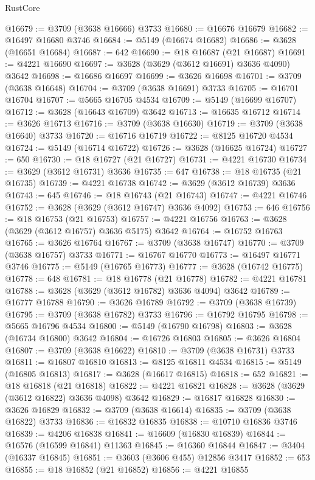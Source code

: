 \begin{lexlean}{RustCore}
\begin{coremodule}
@16679 := @3709 (@3638 @16666) @3733
@16680 := @16676 @16679
@16682 := @16497 @16680 @3746
@16684 := @5149 (@16674 @16682)
@16686 := @3628 (@16651 @16684)
@16687 := 642
@16690 := @18 @16687 (@21 @16687)
@16691 := @4221 @16690
@16697 := @3628 (@3629 (@3612 @16691) @3636 @4090) @3642
@16698 := @16686 @16697
@16699 := @3626 @16698
@16701 := @3709 (@3638 @16648)
@16704 := @3709 (@3638 @16691) @3733
@16705 := @16701 @16704
@16707 := @5665 @16705 @4534
@16709 := @5149 (@16699 @16707)
@16712 := @3628 (@16643 @16709) @3642
@16713 := @16635 @16712
@16714 := @3626 @16713
@16716 := @3709 (@3638 @16630)
@16719 := @3709 (@3638 @16640) @3733
@16720 := @16716 @16719
@16722 := @8125 @16720 @4534
@16724 := @5149 (@16714 @16722)
@16726 := @3628 (@16625 @16724)
@16727 := 650
@16730 := @18 @16727 (@21 @16727)
@16731 := @4221 @16730
@16734 := @3629 (@3612 @16731) @3636
@16735 := 647
@16738 := @18 @16735 (@21 @16735)
@16739 := @4221 @16738
@16742 := @3629 (@3612 @16739) @3636
@16743 := 645
@16746 := @18 @16743 (@21 @16743)
@16747 := @4221 @16746
@16752 := @3628 (@3629 (@3612 @16747) @3636 @4092)
@16753 := 646
@16756 := @18 @16753 (@21 @16753)
@16757 := @4221 @16756
@16763 := @3628 (@3629 (@3612 @16757) @3636 @5175) @3642
@16764 := @16752 @16763
@16765 := @3626 @16764
@16767 := @3709 (@3638 @16747)
@16770 := @3709 (@3638 @16757) @3733
@16771 := @16767 @16770
@16773 := @16497 @16771 @3746
@16775 := @5149 (@16765 @16773)
@16777 := @3628 (@16742 @16775)
@16778 := 648
@16781 := @18 @16778 (@21 @16778)
@16782 := @4221 @16781
@16788 := @3628 (@3629 (@3612 @16782) @3636 @4094) @3642
@16789 := @16777 @16788
@16790 := @3626 @16789
@16792 := @3709 (@3638 @16739)
@16795 := @3709 (@3638 @16782) @3733
@16796 := @16792 @16795
@16798 := @5665 @16796 @4534
@16800 := @5149 (@16790 @16798)
@16803 := @3628 (@16734 @16800) @3642
@16804 := @16726 @16803
@16805 := @3626 @16804
@16807 := @3709 (@3638 @16622)
@16810 := @3709 (@3638 @16731) @3733
@16811 := @16807 @16810
@16813 := @8125 @16811 @4534
@16815 := @5149 (@16805 @16813)
@16817 := @3628 (@16617 @16815)
@16818 := 652
@16821 := @18 @16818 (@21 @16818)
@16822 := @4221 @16821
@16828 := @3628 (@3629 (@3612 @16822) @3636 @4098) @3642
@16829 := @16817 @16828
@16830 := @3626 @16829
@16832 := @3709 (@3638 @16614)
@16835 := @3709 (@3638 @16822) @3733
@16836 := @16832 @16835
@16838 := @10710 @16836 @3746
@16839 := @4206 @16838
@16841 := @16609 (@16830 @16839)
@16844 := @16576 (@16599 @16841) @11363
@16845 := @16360 @16844
@16847 := @3404 (@16337 @16845)
@16851 := @3603 (@3606 @455) @12856 @3417
@16852 := 653
@16855 := @18 @16852 (@21 @16852)
@16856 := @4221 @16855

\end{coremodule}
\end{lexlean}
